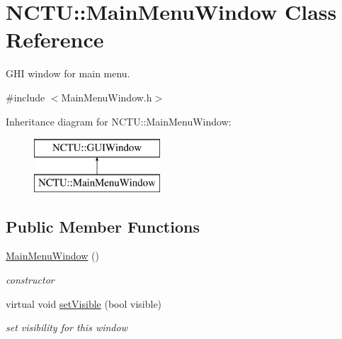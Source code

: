 \hypertarget{class_n_c_t_u_1_1_main_menu_window}{}\section{N\+C\+TU\+:\+:Main\+Menu\+Window Class Reference}
\label{class_n_c_t_u_1_1_main_menu_window}


G\+HI window for main menu.  




{\ttfamily \#include $<$Main\+Menu\+Window.\+h$>$}

Inheritance diagram for N\+C\+TU\+:\+:Main\+Menu\+Window\+:\begin{figure}[H]
\begin{center}
\leavevmode
\includegraphics[height=2.000000cm]{class_n_c_t_u_1_1_main_menu_window}
\end{center}
\end{figure}
\subsection*{Public Member Functions}
\begin{DoxyCompactItemize}
\item 
\hyperlink{class_n_c_t_u_1_1_main_menu_window_adefbd912034f753e6e22049f18d947e8}{Main\+Menu\+Window} ()\hypertarget{class_n_c_t_u_1_1_main_menu_window_adefbd912034f753e6e22049f18d947e8}{}\label{class_n_c_t_u_1_1_main_menu_window_adefbd912034f753e6e22049f18d947e8}

\begin{DoxyCompactList}\small\item\em constructor \end{DoxyCompactList}\item 
virtual void \hyperlink{class_n_c_t_u_1_1_main_menu_window_a6587f39dabd84762a2ce44357a372177}{set\+Visible} (bool visible)\hypertarget{class_n_c_t_u_1_1_main_menu_window_a6587f39dabd84762a2ce44357a372177}{}\label{class_n_c_t_u_1_1_main_menu_window_a6587f39dabd84762a2ce44357a372177}

\begin{DoxyCompactList}\small\item\em set visibility for this window \end{DoxyCompactList}\end{DoxyCompactItemize}
